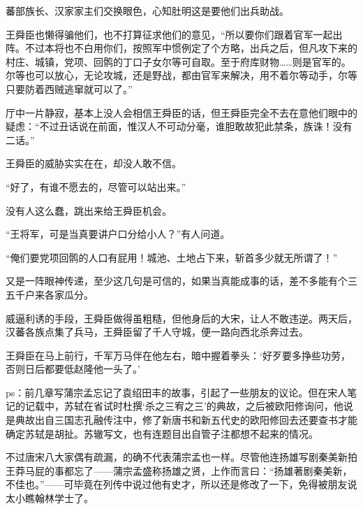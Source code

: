 蕃部族长、汉家家主们交换眼色，心知肚明这是要他们出兵助战。

王舜臣也懒得骗他们，也不打算征求他们的意见，“所以要你们跟着官军一起出阵。不过本将也不白用你们，按照军中惯例定了个方略，出兵之后，但凡攻下来的村庄、城镇，党项、回鹘的丁口子女尔等可自取。至于府库财物……则是官军的。尔等也可以放心，无论攻城，还是野战，都由官军来解决，用不着尔等动手，尔等只要防着西贼逃窜就可以了。”

厅中一片静寂，基本上没人会相信王舜臣的话，但王舜臣完全不去在意他们眼中的疑虑：“不过丑话说在前面，惟汉人不可动分毫，谁胆敢故犯此禁条，族诛！没有二话。”

王舜臣的威胁实实在在，却没人敢不信。

“好了，有谁不愿去的，尽管可以站出来。”

没有人这么蠢，跳出来给王舜臣机会。

“王将军，可是当真要讲户口分给小人？”有人问道。

“俺们要党项回鹘的人口有屁用！城池、土地占下来，斩首多少就无所谓了！”

又是一阵眼神传递，至少这几句是可信的，如果当真能成事的话，差不多能有个三五千户来各家瓜分。

威逼利诱的手段，王舜臣做得虽粗糙，但他身后的大宋，让人不敢违逆。两天后，汉蕃各族点集了兵马，王舜臣留了千人守城，便一路向西北杀奔过去。

王舜臣在马上前行，千军万马伴在他左右，暗中握着拳头：‘好歹要多挣些功劳，否则日后都要低赵隆他一头了。’

ps：前几章写蒲宗孟忘记了袁绍田丰的故事，引起了一些朋友的议论。但在宋人笔记的记载中，苏轼在省试时杜撰‘杀之三宥之三’的典故，之后被欧阳修询问，他说是典故出自三国志孔融传注中，修了新唐书和新五代史的欧阳修回去还要查书才能确定苏轼是胡扯。苏辙写文，也有连题目出自管子注都想不起来的情况。

不过唐宋八大家偶有疏漏，的确不代表蒲宗孟也一样。尽管他连扬雄写剧秦美新拍王莽马屁的事都忘了——蒲宗孟盛称扬雄之贤，上作而言曰：“扬雄著剧秦美新，不佳也。”——可毕竟在列传中说过他有史才，所以还是修改了一下，免得被朋友说太小瞧翰林学士了。

